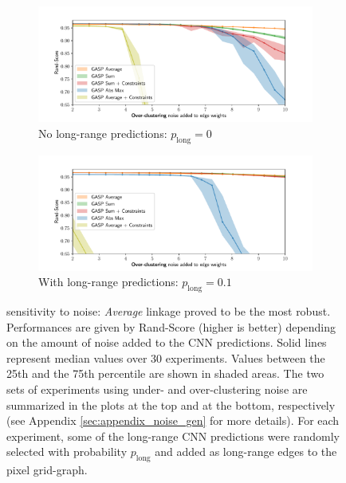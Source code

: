 \begin{figure}
        \begin{subfigure}[t]{0.49 \textwidth}
        \centering
        \includegraphics[width=\textwidth,trim=0.53in 0.1in 0.65in 0.45in,clip]{./figs/noise_plots/over_segment_plots_0.pdf}
        \caption{No long-range predictions: $p_{\mathrm{long}}=0$} \label{fig:merge_noise_only_direct}
    \end{subfigure} \hfill
    \begin{subfigure}[t]{0.49 \textwidth}
        \centering
        \includegraphics[width=\textwidth,trim=0.53in 0.1in 0.65in 0.45in,clip]{./figs/noise_plots/over_segment_plots_1.pdf}
        \caption{With long-range predictions: $p_{\mathrm{long}}=0.1$} \label{fig:merge_noise_with_long_range}
    \end{subfigure}
\caption{\algname{} sensitivity to noise: \emph{Average} linkage proved to be the most robust. Performances are given by Rand-Score (higher is better) depending on the amount of noise added to the CNN predictions. Solid lines represent median values over 30 experiments. Values between the 25th and the 75th percentile are shown in shaded areas. The two sets of experiments using under- and over-clustering noise are summarized in the plots at the top and at the bottom, respectively (see Appendix \ref{sec:appendix_noise_gen} for more details). For each experiment, some of the long-range CNN predictions were randomly selected with probability $p_{\mathrm{long}}$ and added as long-range edges to the pixel grid-graph.
}\label{fig:noise_plots}
\end{figure}

